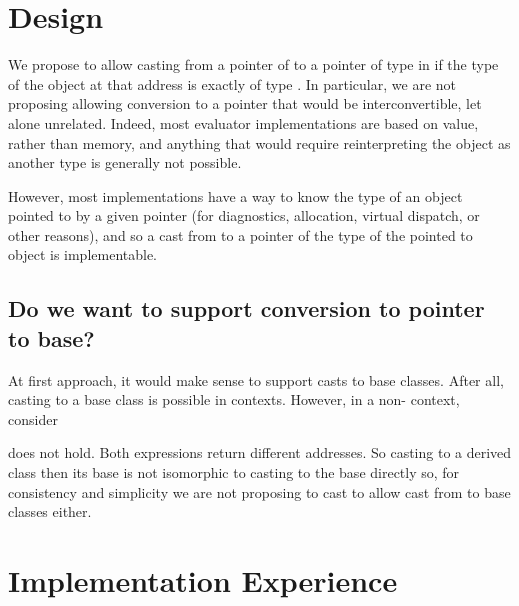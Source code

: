 \documentclass{wg21}
\begin{document}
    \section{Design}

    We propose to allow casting from a pointer of  to a pointer of type  in  if the type of the object at that address is exactly of type .
    In particular, we are not proposing allowing conversion to a pointer that would be interconvertible, let alone unrelated.
    Indeed, most  evaluator implementations are based on value, rather than memory, and anything that would require reinterpreting the object as another type is generally not possible.

    However, most implementations have a way to know the type of an object pointed to by a given pointer (for diagnostics,  allocation, virtual dispatch, or other reasons), and so a cast from  to a pointer of the type of the pointed to object is implementable.

    \subsection{Do we want to support conversion to pointer to base?}

    At first approach, it would make sense to support casts to base classes.
    After all, casting to a base class is possible in  contexts.
    However, in a non- context, consider


     does not hold. Both expressions return different addresses.
    So casting to a derived class then its base is not isomorphic to casting to the base directly so, for consistency and simplicity we are not proposing
    to cast to allow cast from  to base classes either.

    \section{Implementation Experience}
\end{document}
